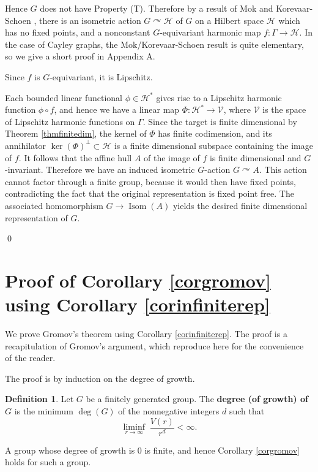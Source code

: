 \documentclass[12pt]{amsart}
\numberwithin{equation}{section}
\theoremstyle{plain}
\theoremstyle{remark}
\theoremstyle{definition}
\newtheorem{definition}[equation]{Definition}
\newcommand{\ra}{\rightarrow}
\newcommand{\h}{{\mathcal H}}
\newcommand{\V}{{\mathcal V}}
\newcommand{\acts}{\curvearrowright}
\newcommand{\isom}{\operatorname{Isom}}
\def\Ga{\Gamma}
\def\ra{\rightarrow}
\begin{document}
Hence $G$  does not have Property (T).  
Therefore
by a result of Mok \cite{mok}
and Korevaar-Schoen \cite[Theorem 4.1.2]{korevaarschoen}, 
there is an isometric 
action $G\acts \h$ of $G$ on a 
Hilbert space $\h$ which has no fixed points,  and a nonconstant 
$G$-equivariant 
harmonic map $f:\Ga\ra \h$.  In the case of
Cayley graphs, the Mok/Korevaar-Schoen result is quite elementary,
so we give a short proof in Appendix A. 



Since $f$ is $G$-equivariant,
it is Lipschitz.

Each bounded linear functional $\phi\in\h^*$ gives rise to a 
Lipschitz harmonic
function $\phi\circ f$, and hence we have a linear map 
$\Phi:\h^*\ra \V$, where $\V$ is the space of Lipschitz
harmonic functions on $\Ga$.  Since the target is finite dimensional
by Theorem \ref{thmfinitedim}, the kernel of $\Phi$ has finite
codimension, and its annihilator $\ker(\Phi)^\perp\subset\h$ is
a  finite dimensional subspace containing the image of $f$.
It follows that the affine hull $A$ of the image of $f$ is 
finite dimensional
and $G$-invariant.  Therefore we have an induced isometric 
$G$-action $G\acts A$.  
This action cannot factor through a finite group, because it 
would then have 
fixed points, contradicting the fact that the original 
representation
is fixed point free.  The associated homomorphism 
$G\ra \isom(A)$ yields the
desired finite dimensional representation of $G$.

\qed










\section{Proof of Corollary \ref{corgromov} using Corollary 
\ref{corinfiniterep}}
\label{secgromov}

We prove Gromov's theorem using Corollary \ref{corinfiniterep}.
The proof is a recapitulation of Gromov's argument, which  
reproduce here for the convenience of the reader.

The proof is by induction on the degree of growth.

\begin{definition}
Let $G$ be a finitely generated group.  The {\bf degree (of growth)
of $G$} is the minimum $\deg(G)$ of the  nonnegative
integers $d$ such that 
$$
\liminf_{r\ra\infty}\;\frac{V(r)}{r^d}<\infty.
$$
\end{definition}
A group whose degree of growth is $0$ is finite, and hence
Corollary \ref{corgromov} holds for such a group.  
\end{document}
